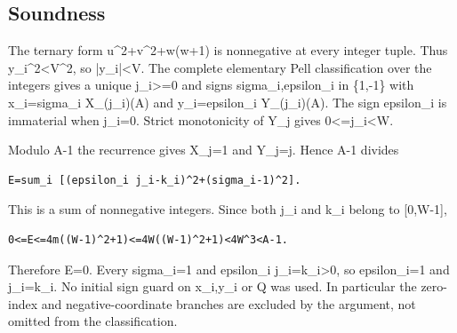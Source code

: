 \subsection{Soundness}



The ternary form u\textasciicircum{}\allowbreak{}2+\allowbreak{}v\textasciicircum{}\allowbreak{}2+\allowbreak{}w(w+\allowbreak{}1) is nonnegative at every integer tuple. Thus y\_\allowbreak{}i\textasciicircum{}\allowbreak{}2\textless{}\allowbreak{}V\textasciicircum{}\allowbreak{}2, so |y\_\allowbreak{}i|\textless{}\allowbreak{}V. The complete elementary Pell classification over the integers gives a unique j\_\allowbreak{}i\textgreater{}\allowbreak{}=\allowbreak{}0 and signs sigma\_\allowbreak{}i,epsilon\_\allowbreak{}i in \{1,-1\} with x\_\allowbreak{}i=\allowbreak{}sigma\_\allowbreak{}i X\_\allowbreak{}(j\_\allowbreak{}i)(A) and y\_\allowbreak{}i=\allowbreak{}epsilon\_\allowbreak{}i Y\_\allowbreak{}(j\_\allowbreak{}i)(A). The sign epsilon\_\allowbreak{}i is immaterial when j\_\allowbreak{}i=\allowbreak{}0. Strict monotonicity of Y\_\allowbreak{}j gives 0\textless{}\allowbreak{}=\allowbreak{}j\_\allowbreak{}i\textless{}\allowbreak{}W.



Modulo A-1 the recurrence gives X\_\allowbreak{}j=\allowbreak{}1 and Y\_\allowbreak{}j=\allowbreak{}j. Hence A-1 divides



\begin{verbatim}
E=sum_i [(epsilon_i j_i-k_i)^2+(sigma_i-1)^2].
\end{verbatim}

This is a sum of nonnegative integers. Since both j\_\allowbreak{}i and k\_\allowbreak{}i belong to [0,W-1],



\begin{verbatim}
0<=E<=4m((W-1)^2+1)<=4W((W-1)^2+1)<4W^3<A-1.
\end{verbatim}

Therefore E=\allowbreak{}0. Every sigma\_\allowbreak{}i=\allowbreak{}1 and epsilon\_\allowbreak{}i j\_\allowbreak{}i=\allowbreak{}k\_\allowbreak{}i\textgreater{}\allowbreak{}0, so epsilon\_\allowbreak{}i=\allowbreak{}1 and j\_\allowbreak{}i=\allowbreak{}k\_\allowbreak{}i. No initial sign guard on x\_\allowbreak{}i,y\_\allowbreak{}i or Q was used. In particular the zero-index and negative-coordinate branches are excluded by the argument, not omitted from the classification.



